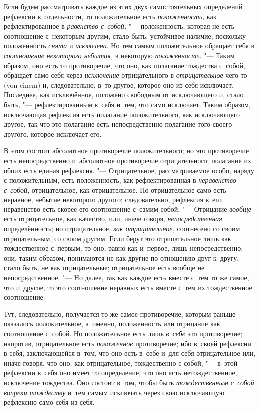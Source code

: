 Если будем рассматривать каждое из этих двух самостоятельных определений
рефлексии в~отдельности, то положительное есть
{\em положенность,} как рефлектированное в
{\em равенство с~собой,} "--- положенность, которая не
есть соотношение с~некоторым другим, стало быть, устойчивое наличие,
поскольку положенность {\em снята} и
{\em исключена}. Но тем самым положительное обращает
себя в {\em соотношение некоторого небытия,} в
некоторую {\em положенность}. "--- Таким образом, оно есть
то противоречие, что оно, как полагание тождества с~собой, обращает само
себя через {\em исключение} отрицательного в
{\em отрицательное} чего-то (von einem) и,
следовательно, в~то другое, которое оно из себя исключает. Последнее, как
исключённое, положено свободным от исключающего и, стало быть, "---
рефлектированным в~себя и~тем, что само исключает. Таким образом,
исключающая рефлексия есть полагание положительного, как исключающего
другое, так что это полагание есть непосредственно полагание того своего
другого, которое исключает его.

В этом состоит абсолютное противоречие положительного; но это противоречие
есть непосредственно и~абсолютное противоречие отрицательного; полагание их
обоих есть единая рефлексия. "--- Отрицательное, рассматриваемое особо, наряду
с положительным, есть положенность, как рефлектированная в
{\em неравенство с~собой,} отрицательное, как
отрицательное. Но отрицательное само есть неравное, небытие некоторого
другого; следовательно, рефлексия в~его неравенство есть скорее его
соотношение с~самим собой. "--- Отрицание {\em вообще}
есть отрицательное, как качество, или, иначе говоря,
{\em непосредственная} определённость; но
отрицательное, {\em как отрицательное,} соотнесено со
своим отрицательным, со своим другим. Если берут это отрицательное лишь как
тождественное с~первым, то оно, равно как и~первое, лишь непосредственно;
они, таким образом, понимаются не как другие по отношению друг к~другу,
стало быть, не как отрицательные; отрицательное есть вообще не
непосредственное. "--- Но далее, так как каждое есть вместе с~тем то же самое,
что и~другое, то это соотношение неравных есть вместе с~тем их
тождественное соотношение.

Тут, следовательно, получается то же самое противоречие, которым раньше
оказалось положительное, а~именно, положенность или отрицание как
соотношение с~собой. Но положительное есть лишь {\em в~себе} это
противоречие; напротив, отрицательное есть
{\em положенное} противоречие; ибо в~своей рефлексии в
себя, заключающейся в~том, что оно есть в~себе и~для себя отрицательное
или, иначе говоря, что оно, как отрицательное, тождественно
с собой, "--- в~этой рефлексии в~себя оно имеет то определение, что оно есть
нетождественное, исключение тождества. Оно состоит в~том, чтобы быть
{\em тождественным с~собой вопреки тождеству} и~тем
самым исключать через свою исключающую рефлексию само себя из себя.

